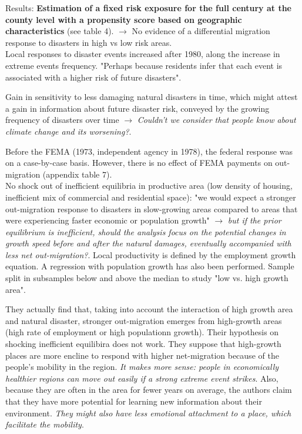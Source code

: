 \documentclass[11pt, oneside]{article}   	%
\begin{document}
Results:
\textbf{Estimation of a fixed risk exposure for the full century at the county level with a propensity score based on geographic characteristics} (see table 4). $\to$ No evidence of a differential migration response to disasters in high vs low risk areas. \\

Local responses to disaster events increased after 1980, along the increase in extreme events frequency. "Perhaps because residents infer that each event is associated with a higher risk of future disasters".

Gain in sensitivity to less damaging natural disasters in time, which might attest a gain in information about future disaster risk, conveyed by the growing frequency of disasters over time $\to$ \textit{Couldn't we consider that people know about climate change and its worsening?}.

Before the FEMA (1973, independent agency in 1978), the federal response was on a case-by-case basis. However, there is no effect of FEMA payments on out-migration (appendix table 7). \\

No shock out of inefficient equilibria in productive area (low density of housing, inefficient mix of commercial and residential space): "we would expect a stronger out-migration response to disasters in slow-growing areas compared to areas that were experiencing faster economic or population growth" $\to$ \textit{but if the prior equilibrium is inefficient, should the analysis focus on the potential changes in growth speed before and after the natural damages, eventually accompanied with less net out-migration?}. Local productivity is defined by the employment growth equation. A regression with population growth has also been performed. Sample split in subsamples below and above the median to study "low vs. high growth area". 

They actually find that, taking into account the interaction of high growth area and natural disaster, stronger out-migration emerges from high-growth areas (high rate of employment or high populationn growth). Their hypothesis on shocking inefficient equilibira does not work. They suppose that high-growth places are more encline to respond with higher net-migration because of the people's mobility in the region. \textit{It makes more sense: people in economically healthier regions can move out easily if a strong extreme event strikes}. Also, because they are often in the area for fewer years on average, the authors claim that they have more potential for learning new information about their environment. \textit{They might also have less emotional attachment to a place, which facilitate the mobility}. \\
\end{document}
